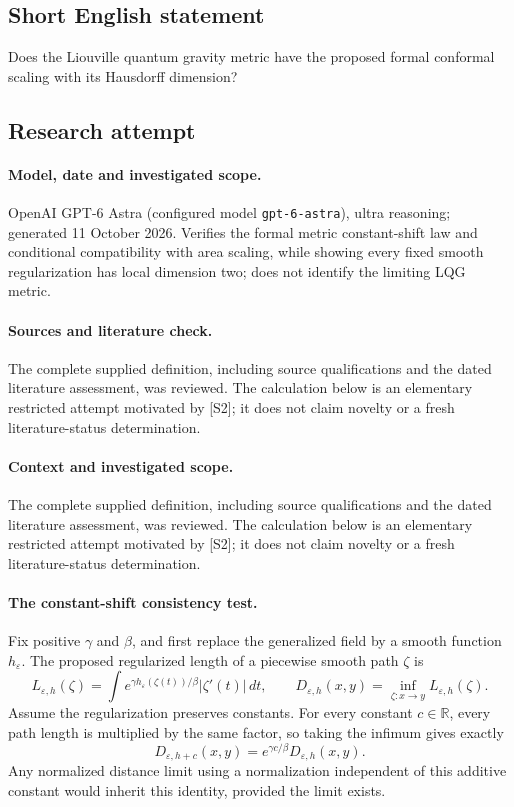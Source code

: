 \documentclass[11pt]{article}
\begin{document}
\subsection{Short English statement}
Does the Liouville quantum gravity metric have the proposed formal conformal scaling with its Hausdorff dimension?
\subsection{Research attempt}
\paragraph{Model, date and investigated scope.}
OpenAI GPT-6 Astra (configured model \texttt{gpt-6-astra}), ultra reasoning; generated 11 October 2026. Verifies the formal metric constant-shift law and conditional compatibility with area scaling, while showing every fixed smooth regularization has local dimension two; does not identify the limiting LQG metric.

\paragraph{Sources and literature check.}
The complete supplied definition, including source qualifications and the dated literature assessment, was reviewed. The calculation below is an elementary restricted attempt motivated by [S2]; it does not claim novelty or a fresh literature-status determination.

\paragraph{Context and investigated scope.} The complete supplied definition, including source qualifications and the dated literature assessment, was reviewed. The calculation below is an elementary restricted attempt motivated by [S2]; it does not claim novelty or a fresh literature-status determination.

\paragraph{The constant-shift consistency test.}
Fix positive $\gamma$ and $\beta$, and first replace the generalized field by a smooth function $h_\varepsilon$. The proposed regularized length of a piecewise smooth path $\zeta$ is
\[
 L_{\varepsilon,h}(\zeta)=\int
 e^{\gamma h_\varepsilon(\zeta(t))/\beta}|\zeta'(t)|\,dt,
 \qquad D_{\varepsilon,h}(x,y)=\inf_{\zeta:x\to y}L_{\varepsilon,h}(\zeta).
\]
Assume the regularization preserves constants. For every constant $c\in\mathbb R$, every path length is multiplied by the same factor, so taking the infimum gives exactly
\[
 D_{\varepsilon,h+c}(x,y)=e^{\gamma c/\beta}D_{\varepsilon,h}(x,y).
\]
Any normalized distance limit using a normalization independent of this additive constant would inherit this identity, provided the limit exists.
\end{document}
